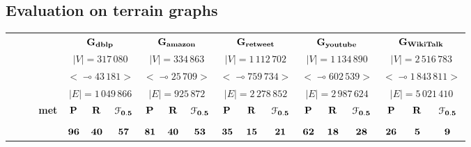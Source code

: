 \documentclass[12pt]{article}
\theoremstyle{thmstyleone}%
\theoremstyle{definition}
\begin{document}
\subsection{Evaluation on terrain graphs\label{SubSecEvalRG}}
\begin{table}[!ht]
\footnotesize
\centering
\begin{tabular}{| l | c c c  | c c c | c c c | c c c | c c c | }
   \hline   & \multicolumn{3}{c|}{\bf $\bf G_{dblp}$}   & \multicolumn{3}{c|}{\bf $\bf G_{amazon}$}   & \multicolumn{3}{c|}{\bf $\bf G_{retweet}$}   & \multicolumn{3}{c|}{\bf $\bf G_{youtube}$}   & \multicolumn{3}{c|}{\bf $\bf G_{WikiTalk}$}\\

   & \multicolumn{3}{c|}{\bf $|V|=317\,080$}   & \multicolumn{3}{c|}{\bf $|V|=334\,863$}   & \multicolumn{3}{c|}{\bf $|V|=1\,112\,702$}   & \multicolumn{3}{c|}{\bf $|V|=1\,134\,890$}   & \multicolumn{3}{c|}{\bf $|V|=2\,516\,783$}\\

   & \multicolumn{3}{c|}{\bf $<\multimap43\,181>$}   & \multicolumn{3}{c|}{\bf $<\multimap25\,709>$}   & \multicolumn{3}{c|}{\bf $<\multimap759\,734>$}   & \multicolumn{3}{c|}{\bf $<\multimap602\,539>$}   & \multicolumn{3}{c|}{\bf $<\multimap1\,843\,811>$}\\

   & \multicolumn{3}{c|}{\bf $|E|=1\,049\,866$}   & \multicolumn{3}{c|}{\bf $|E|=925\,872$}   & \multicolumn{3}{c|}{\bf $|E|=2\,278\,852$}   & \multicolumn{3}{c|}{\bf $|E|=2\,987\,624$}   & \multicolumn{3}{c|}{\bf $|E|=5\,021\,410$}\\ \hline

   \textbf{~~~~~met}     & $\bf P$ & $\bf R$ &  $\bf \EuScript{F}_{0.5}$ & $\bf P$ & $\bf R$ &  $\bf \EuScript{F}_{0.5}$ & $\bf P$ & $\bf R$ &  $\bf \EuScript{F}_{0.5}$ & $\bf P$ & $\bf R$ &  $\bf \EuScript{F}_{0.5}$ & $\bf P$ & $\bf R$ &  $\bf \EuScript{F}_{0.5}$ \\\hline

\multicolumn{1}{c}{}& \multicolumn{15}{c}{} \\ \hline
& $\bf 96$ & $\bf 40$ & $\bf 57$ & $\bf 81$ & $\bf 40$ & $\bf 53$ & $\bf 35$ & $\bf 15$ & $\bf 21$ & $\bf 62$ & $\bf 18$ & $\bf 28$ & $\bf 26$ & $\bf 5$ & $\bf 9$ \\


\end{tabular}
\end{table}
\end{document}
